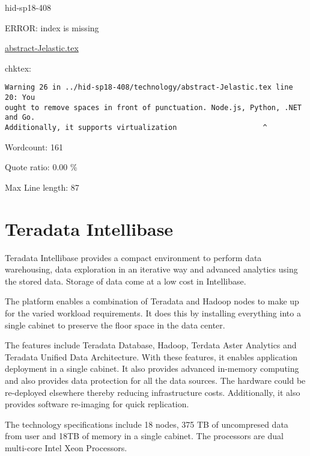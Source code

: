 \begin{IU}

hid-sp18-408

ERROR: index is missing

\href{https://github.com/cloudmesh-community/hid-sp18-408/blob/master//technology/abstract-Jelastic.tex}{abstract-Jelastic.tex}

 
chktex:
\begin{tiny}
\begin{verbatim}
Warning 26 in ../hid-sp18-408/technology/abstract-Jelastic.tex line 20: You
ought to remove spaces in front of punctuation. Node.js, Python, .NET and Go.
Additionally, it supports virtualization                    ^
\end{verbatim}
\end{tiny}

Wordcount: 161


Quote ratio: 0.00 \%
 
Max Line length: 87
\end{IU}

\section{Teradata Intellibase}

Teradata Intellibase provides a compact environment to perform
data warehousing, data exploration in an iterative way and advanced 
analytics using the stored data. Storage of data come at a low cost 
in Intellibase.

The platform enables a combination of Teradata and Hadoop nodes
to make up for the varied workload requirements. It does this by installing
everything into a single cabinet to preserve the floor space in the data
center.

The features include Teradata Database, Hadoop, Terdata Aster Analytics and
Teradata Unified Data Architecture. With these features, it enables application
deployment in a single cabinet. It also provides advanced in-memory computing 
and also provides data protection for all the data sources. The hardware could 
be re-deployed elsewhere thereby reducing infrastructure costs. Additionally,
it also provides software re-imaging for quick replication.

The technology specifications include 18 nodes, 375 TB of uncompresed data from
user and 18TB of memory in a single cabinet. The processors are dual multi-core 
Intel Xeon Processors\cite{hid-sp18-408-TeradataIntellibase}.

